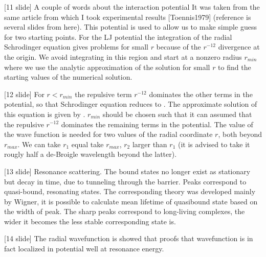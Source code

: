 \documentclass[12pt]{article}
\begin{document}
[11 slide] A couple of words about the interaction potential It was taken from the same article from which I took experimental results [Toennis1979] (reference is several slides from here). This potential is used to allow us to make simple guess for two starting points. For the LJ potential the integration of the radial Schrodinger equation gives problems for small $r$ because of the $r^{-12}$ divergence at the origin. We avoid integrating in this region and start at a nonzero radius $r_{min}$ where we use the analytic approximation of the solution for small $r$ to find the starting values of the numerical solution.

[12 slide] For $r < r_{min}$ the repulsive term $r^{-12}$ dominates the other terms in the potential, so that Schrodinger equation reduces to . The approximate solution of this equation is given by . $r_{min}$ should be chosen such that it can assumed that the repulsive $r^{-12}$ dominates the remaining terms in the potential. The value of the wave function is needed for two values of the radial coordinate $r$, both beyond $r_{max}$. We can take $r_1$ equal take $r_{max}$, $r_2$ larger than $r_1$ (it is advised to take it rougly half a de-Broigle wavelength beyond the latter). 

[13 slide] Resonance scattering. The bound states no longer exist as stationary but decay in time, due to tunneling through the barrier.
Peaks correspond to quasi-bound, resonating states. The corresponding theory was developed mainly by Wigner, it is possible to calculate mean lifetime of quasibound state based on the width of peak. The sharp peaks correspond to long-living complexes, the wider it becomes the less stable corresponding state is.

[14 slide] The radial wavefunction is showed that proofs that wavefunction is in fact localized in potential well at resonance energy.
\end{document}
